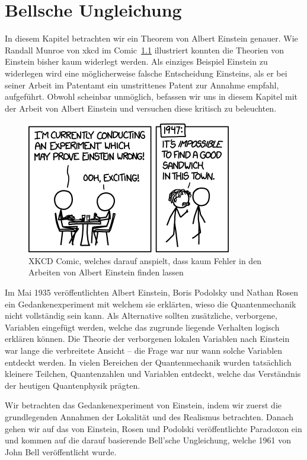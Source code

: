 \chapter{Bellsche Ungleichung\label{chapter:bell}}
\begin{refsection}

In diesem Kapitel betrachten wir ein Theorem von Albert Einstein genauer.
Wie Randall Munroe von xkcd im
Comic~\ref{fig:bell:xkcd_einstein} illustriert konnten die Theorien von
Einstein bisher kaum widerlegt werden.
Als einziges Beispiel Einstein zu widerlegen wird eine m\"oglicherweise falsche
Entscheidung Einsteins, als er bei seiner Arbeit im Patentamt ein umstrittenes
Patent zur Annahme empfahl, aufgef\"uhrt.
Obwohl scheinbar unm\"oglich, befassen wir uns in diesem Kapitel mit der Arbeit
von Albert Einstein und versuchen diese kritisch zu beleuchten.

\begin{figure}[b]
    \centering
    \includegraphics[width=0.5\linewidth]{bell/images/xkcd_einstein.png}
    \caption{XKCD Comic, welches darauf anspielt, dass kaum Fehler 
    in den Arbeiten von Albert Einstein finden lassen \cite{Bell:XkcdComic.}}
    \label{fig:bell:xkcd_einstein}
\end{figure}


Im Mai 1935 ver\"offentlichten Albert Einstein, Boris Podolsky und
Nathan Rosen ein Gedankenexperiment mit welchem sie erkl\"arten, wieso
die Quantenmechanik nicht vollst\"andig sein kann. Als Alternative
sollten zus\"atzliche, verborgene, Variablen eingef\"ugt werden, welche
das zugrunde liegende Verhalten logisch erkl\"aren k\"onnen.
Die Theorie der verborgenen lokalen Variablen nach Einstein war lange
die verbreitete Ansicht -- die Frage war nur wann solche Variablen
entdeckt werden. In vielen Bereichen der Quantenmechanik wurden tats\"achlich
kleinere Teilchen, Quantenzahlen und Variablen entdeckt, welche das
Verst\"andnis der heutigen Quantenphysik pr\"agten.

Wir betrachten das Gedankenexperiment von Einstein, indem wir zuerst die
grundlegenden Annahmen der Lokalit\"at und des Realismus betrachten. Danach
gehen wir auf das von Einstein, Rosen und Podolski ver\"offentlichte Paradoxon
ein und kommen auf die darauf basierende Bell'sche Ungleichung, welche
1961 von John Bell ver\"offentlicht wurde.


\end{refsection}
